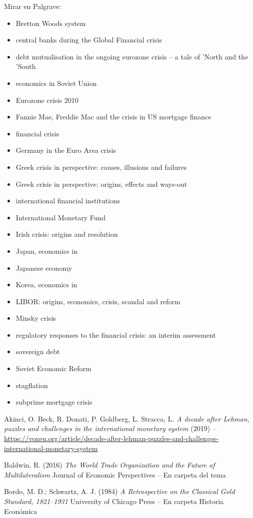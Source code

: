 \documentclass{nuevotema}
\begin{document}
Mirar en Palgrave:
\begin{itemize}
	\item Bretton Woods system
	\item central banks during the Global Financial crisis
	\item debt mutualisation in the ongoing eurozone crisis -- a tale of 'North and the 'South
	\item economics in Soviet Union
	\item Eurozone crisis 2010
	\item Fannie Mae, Freddie Mac and the crisis in US mortgage finance
	\item financial crisis
	\item Germany in the Euro Area crisis
	\item Greek crisis in perspective: causes, illusions and failures
	\item Greek crisis in perspective: origins, effects and ways-out
	\item international financial institutions
	\item International Monetary Fund
	\item Irish crisis: origins and resolution
	\item Japan, economics in
	\item Japanese economy
	\item Korea, economics in
	\item LIBOR: origins, economics, crisis, scandal and reform
	\item Minsky crisis
	\item regulatory responses to the financial crisis: an interim assessment
	\item sovereign debt
	\item Soviet Economic Reform
	\item stagflation
	\item subprime mortgage crisis
\end{itemize} 

Akinci, O. Beck, R. Donati, P. Goldberg, L. Stracca, L. \textit{A decade after Lehman, puzzles and challenges in the international monetary system} (2019) -- \url{https://voxeu.org/article/decade-after-lehman-puzzles-and-challenges-international-monetary-system}

Baldwin, R. (2016) \textit{The World Trade Organization and the Future of Multilateralism} Journal of Economic Perspectives -- En carpeta del tema

Bordo, M. D.; Schwartz, A. J. (1984) \textit{A Retrospective on the Classical Gold Standard, 1821--1931} University of Chicago Press -- En carpeta Historia Económica
\end{document}
